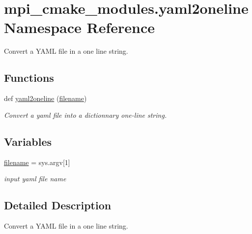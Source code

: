 \hypertarget{namespacempi__cmake__modules_1_1yaml2oneline}{}\section{mpi\+\_\+cmake\+\_\+modules.\+yaml2oneline Namespace Reference}
\label{namespacempi__cmake__modules_1_1yaml2oneline}


Convert a Y\+A\+ML file in a one line string.  


\subsection*{Functions}
\begin{DoxyCompactItemize}
\item 
def \hyperlink{namespacempi__cmake__modules_1_1yaml2oneline_a82021b35eab75040f7372ecfd4f21b0d}{yaml2oneline} (\hyperlink{namespacempi__cmake__modules_1_1yaml2oneline_ac27969d1fd9b275701d6a253c87c6eb1}{filename})
\begin{DoxyCompactList}\small\item\em Convert a yaml file into a dictionnary one-\/line string. \end{DoxyCompactList}\end{DoxyCompactItemize}
\subsection*{Variables}
\begin{DoxyCompactItemize}
\item 
\hyperlink{namespacempi__cmake__modules_1_1yaml2oneline_ac27969d1fd9b275701d6a253c87c6eb1}{filename} = sys.\+argv\mbox{[}1\mbox{]}\hypertarget{namespacempi__cmake__modules_1_1yaml2oneline_ac27969d1fd9b275701d6a253c87c6eb1}{}\label{namespacempi__cmake__modules_1_1yaml2oneline_ac27969d1fd9b275701d6a253c87c6eb1}

\begin{DoxyCompactList}\small\item\em input yaml file name \end{DoxyCompactList}\end{DoxyCompactItemize}


\subsection{Detailed Description}
Convert a Y\+A\+ML file in a one line string. 

